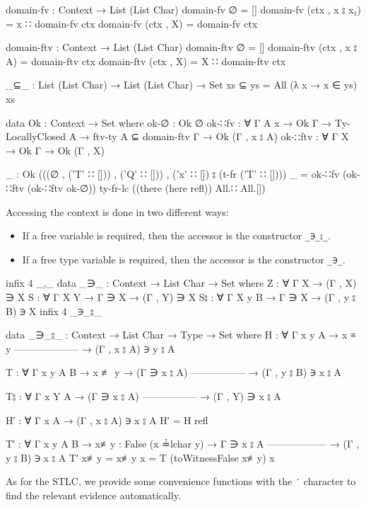 \documentclass[logo,bsc,singlespacing,parskip,online]{infthesis}
\renewenvironment{code}{\mintedcopy[breaklines,breaksymbolleft=\;]{agda}}{\endmintedcopy}
\begin{document}
\begin{code}
  domain-fv : Context → List (List Char)
  domain-fv ∅ = []
  domain-fv (ctx , x ⦂ x₁) = x ∷ domain-fv ctx
  domain-fv (ctx , X) = domain-fv ctx

  domain-ftv : Context → List (List Char)
  domain-ftv ∅ = []
  domain-ftv (ctx , x ⦂ A) = domain-ftv ctx
  domain-ftv (ctx , X) = X ∷ domain-ftv ctx

  _⊆_ : List (List Char) → List (List Char) → Set
  xs ⊆ ys = All (λ x → x ∈ ys) xs

  data Ok : Context → Set where
    ok-∅ : Ok ∅
    ok-∷fv : ∀ {Γ A x} → Ok Γ → Ty-LocallyClosed A → ftv-ty A ⊆ domain-ftv Γ → Ok (Γ , x ⦂ A)
    ok-∷ftv : ∀ {Γ X} → Ok Γ → Ok (Γ , X)

  _ : Ok (((∅ , ('T' ∷ [])) , ('Q' ∷ [])) , ('x' ∷ []) ⦂ (t-fr ('T' ∷ [])))
  _ = ok-∷fv (ok-∷ftv (ok-∷ftv ok-∅)) ty-fr-lc ((there (here refl)) All.∷ All.[])
\end{code}

Accessing the context is done in two different ways:
\begin{itemize}
  \item If a free variable is required, then the accessor is the constructor \texttt{\_∋\_⦂\_}.
  \item If a free type variable is required, then the accessor is the constructor \texttt{\_∋\_}.
\end{itemize}
\begin{code}
  infix 4 _,_
  data _∋_ : Context → List Char → Set where
    Z : ∀ {Γ X} → (Γ , X) ∋ X
    S : ∀ {Γ X Y} → Γ ∋ X → (Γ , Y) ∋ X
    S⦂ : ∀ {Γ X y B} → Γ ∋ X → (Γ , y ⦂ B) ∋ X
  infix 4 _∋_⦂_

  data _∋_⦂_ : Context → List Char → Type → Set where
    H : ∀ {Γ x y A}
      → x ≡ y
        --------------------
      → (Γ , x ⦂ A) ∋ y ⦂ A

    T : ∀ {Γ x y A B}
      → x ≢ y
      → (Γ ∋ x ⦂ A)
        -----------------
      → (Γ , y ⦂ B) ∋ x ⦂ A

    T⦂ : ∀ {Γ x Y A}
      → (Γ ∋ x ⦂ A)
        -----------------
      → (Γ , Y) ∋ x ⦂ A

  H′ : ∀ {Γ x A} → (Γ , x ⦂ A) ∋ x ⦂ A
  H′ = H refl

  T′ : ∀ {Γ x y A B}
    → {x≢y : False (x ≟lchar y)}
    → Γ ∋ x ⦂ A
      ------------------
    → (Γ , y ⦂ B) ∋ x ⦂ A
  T′ { x≢y = x≢y } x = T (toWitnessFalse x≢y) x
\end{code}

As for the STLC, we provide some convenience functions with the \texttt{′} character to find the
relevant evidence automatically.
\end{document}

